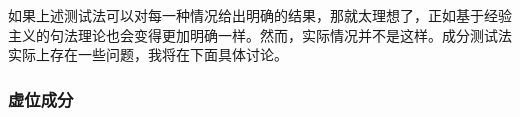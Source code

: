 如果上述测试法可以对每一种情况给出明确的结果，那就太理想了，正如基于经验主义的句法理论也会变得更加明确一样。然而，实际情况并不是这样。成分测试法实际上存在一些问题，我将在下面具体讨论。

\subsubsection{虚位成分}

